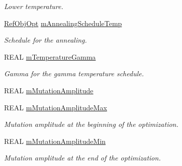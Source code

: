 \begin{DoxyCompactItemize}
\begin{DoxyCompactList}\small\item\em Lower temperature. \end{DoxyCompactList}\item 
\mbox{\label{class_obj_cryst_1_1_monte_carlo_obj_ae630f1608e3be9b01159d0780980eb08}} 
\mbox{\hyperlink{class_obj_cryst_1_1_ref_obj_opt}{Ref\+Obj\+Opt}} \mbox{\hyperlink{class_obj_cryst_1_1_monte_carlo_obj_ae630f1608e3be9b01159d0780980eb08}{m\+Annealing\+Schedule\+Temp}}
\begin{DoxyCompactList}\small\item\em Schedule for the annealing. \end{DoxyCompactList}\item 
\mbox{\label{class_obj_cryst_1_1_monte_carlo_obj_af1a7aeb7079f01175fbef95b31ca47af}} 
R\+E\+AL \mbox{\hyperlink{class_obj_cryst_1_1_monte_carlo_obj_af1a7aeb7079f01175fbef95b31ca47af}{m\+Temperature\+Gamma}}
\begin{DoxyCompactList}\small\item\em Gamma for the \textquotesingle{}gamma\textquotesingle{} temperature schedule. \end{DoxyCompactList}\item 
R\+E\+AL \mbox{\hyperlink{class_obj_cryst_1_1_monte_carlo_obj_afb02263e40ec89621bffe34ca859be96}{m\+Mutation\+Amplitude}}
\item 
\mbox{\label{class_obj_cryst_1_1_monte_carlo_obj_ae56181bde6b87eeeb24a6fdd1428a0b9}} 
R\+E\+AL \mbox{\hyperlink{class_obj_cryst_1_1_monte_carlo_obj_ae56181bde6b87eeeb24a6fdd1428a0b9}{m\+Mutation\+Amplitude\+Max}}
\begin{DoxyCompactList}\small\item\em Mutation amplitude at the beginning of the optimization. \end{DoxyCompactList}\item 
\mbox{\label{class_obj_cryst_1_1_monte_carlo_obj_a6f4e6631d2079c0ac3f82a271a6ad3ec}} 
R\+E\+AL \mbox{\hyperlink{class_obj_cryst_1_1_monte_carlo_obj_a6f4e6631d2079c0ac3f82a271a6ad3ec}{m\+Mutation\+Amplitude\+Min}}
\begin{DoxyCompactList}\small\item\em Mutation amplitude at the end of the optimization. \end{DoxyCompactList}\item 

\end{DoxyCompactItemize}
